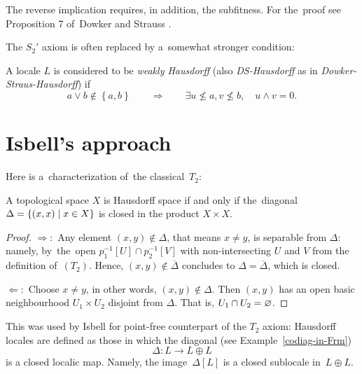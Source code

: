\begin{rem}
  The reverse implication requires, in addition, the subfitness.
  For the~proof see Proposition 7 of~Dowker and Strauss
  \cite{ds72}.
\end{rem}

The $S_2'$ axiom is often replaced by a~somewhat stronger condition:

\begin{framed}
  \begin{df}[DS-Haus]
    A locale $L$ is considered to be \emph{weakly Hausdorff\/} (also
    \emph{DS-Hausdorff} as in \emph{Dowker-Straus-Hausdorff}) if
    \[
      a \vee b \not\in \left\{a, b\right\} \qquad \Rightarrow \qquad \exists
      u\not\leq a, v\not\leq b, \quad u \wedge v = 0.
    \]
  \end{df}
\end{framed}

\section{Isbell's approach}

Here is a~characterization of~the classical~$T_2$:

\begin{prop}
  A topological space $X$ is Hausdorff space if and only if the~diagonal
  $\Delta = \left\{(x, x) \mid x\in X \right\}$ is closed in the product
  $X\times X$.
\end{prop}

\begin{proof}
  $\Rightarrow:$ Any element $(x, y)\not\in \Delta$, that means $x \ne y$, is
  separable from $\Delta$:
  namely, by~the~open $p_1^{-1}[U] \cap p_2^{-1}[V]$ with non-intersecting $U$
  and $V$ from the definition of~$(T_2)$.
  Hence, $(x, y)\not\in \overline{\Delta}$ concludes to $\Delta =
  \overline{\Delta}$, which is closed.

  $\Leftarrow:$ Choose $x \ne y$, in other words, $(x, y)\not\in \Delta$.
  Then $(x, y)$ has an open basic neighbourhood $U_1\times U_2$ disjoint from
  $\Delta$.
  That is, $U_1 \cap U_2 = \varnothing$.
\end{proof}

This was used by Isbell \cite{isbell72} for point-free counterpart of the $T_2$
axiom:
Hausdorff locales are defined as those in which the diagonal (see
Example~\ref{codiag-in-Frm})
\[
  \Delta\colon L \to L \oplus L
\]
is a closed localic map.
Namely, the image~$\Delta[L]$ is a closed sublocale in~$L \oplus L$.

